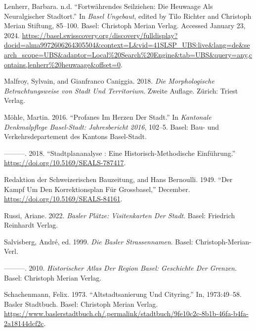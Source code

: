 \documentclass[
  letterpaper,
  DIV=11,
  numbers=noendperiod]{scrartcl}
\newlength{\cslhangindent}
\newenvironment{CSLReferences}[2] %
 {\begin{list}{}{%
  \setlength{\itemindent}{0pt}
  \setlength{\leftmargin}{0pt}
  \setlength{\parsep}{0pt}
  \ifodd #1
   \setlength{\leftmargin}{\cslhangindent}
   \setlength{\itemindent}{-1\cslhangindent}
  \fi
  \setlength{\itemsep}{#2\baselineskip}}}
 {\end{list}}
\begin{document}
\begin{CSLReferences}{1}{0}
Lenherr, Barbara. n.d. {``Fortwährendes {Seilziehen}: {Die} {Heuwaage}
Als Neuralgischer {Stadtort}.''} In \emph{Basel Ungebaut}, edited by
Tilo Richter and Christoph Merian Stiftung, 85--100. Basel: Christoph
Merian Verlag. Accessed January 23, 2024.
\url{https://basel.swisscovery.org/discovery/fulldisplay?docid=alma9972606264305504&context=L&vid=41SLSP_UBS:live&lang=de&search_scope=UBS&adaptor=Local\%20Search\%20Engine&tab=UBS&query=any,contains,lenherr\%20heuwaage&offset=0}.

Malfroy, Sylvain, and Gianfranco Caniggia. 2018. \emph{Die
Morphologische {Betrachtungsweise} von {Stadt} Und {Territorium}}.
Zweite Auflage. Zürich: Triest Verlag.

Möhle, Martin. 2016. {``Profanes Im {Herzen} Der {Stadt}.''} In
\emph{Kantonale {Denkmalpflege} {Basel}-{Stadt}: {Jahresbericht} 2016},
102--5. Basel: Bau- und Verkehrsdepartement des Kantons Basel-Stadt.

---------. 2018. {``Stadtplananalyse : Eine Historisch-Methodische
{Einführung}.''} \url{https://doi.org/10.5169/SEALS-787417}.

Redaktion der Schweizerischen Bauzeitung, and Hans Bernoulli. 1949.
{``Der {Kampf} Um Den {Korrektionsplan} Für {Grossbasel},''} December.
\url{https://doi.org/10.5169/SEALS-84161}.

Russi, Ariane. 2022. \emph{Basler {Plätze}: {Visitenkarten} Der
{Stadt}}. Basel: Friedrich Reinhardt Verlag.

Salvisberg, André, ed. 1999. \emph{Die {Basler} {Strassennamen}}. Basel:
Christoph-Merian-Verl.

---------. 2010. \emph{Historischer {Atlas} Der {Region} {Basel}:
{Geschichte} Der {Grenzen}}. Basel: Christoph Merian Verlag.

Schachenmann, Felix. 1973. {``Altstadtsanierung Und {Cityring}.''} In,
1973:49--58. Basler {Stadtbuch}. Basel: Christoph Merian Verlag.
\url{https://www.baslerstadtbuch.ch/.permalink/stadtbuch/9fe10c2c-8b1b-46fa-b4fa-2a18144dcf2c}.


\end{CSLReferences}
\end{document}
